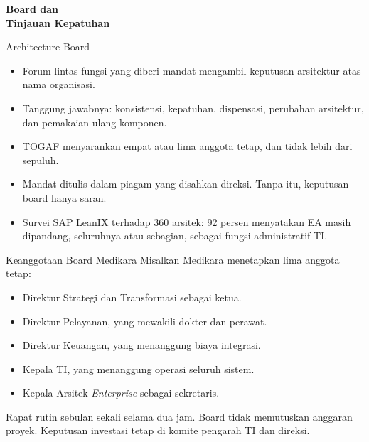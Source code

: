 \documentclass[aspectratio=169, table, 12pt]{beamer}
\begin{document}
\begin{frame}{\hfill}
  \centering
  \Huge{\textbf{Board dan\\Tinjauan Kepatuhan}}
\end{frame}

\begin{frame}{{\Large Architecture Board}}
  \small
  \vspace{4pt}
  \begin{itemize}
    \item Forum lintas fungsi yang diberi mandat mengambil keputusan arsitektur atas nama organisasi.
    \item Tanggung jawabnya: konsistensi, kepatuhan, dispensasi, perubahan arsitektur, dan pemakaian
          ulang komponen.
    \item TOGAF menyarankan empat atau lima anggota tetap, dan tidak lebih dari sepuluh.
    \item Mandat ditulis dalam piagam yang disahkan direksi. Tanpa itu, keputusan board hanya saran.
    \item Survei SAP LeanIX terhadap 360 arsitek: 92 persen menyatakan EA masih dipandang, seluruhnya
          atau sebagian, sebagai fungsi administratif TI.
  \end{itemize}
\end{frame}

\begin{frame}{{\Large Keanggotaan Board Medikara}}
  \small Misalkan Medikara menetapkan lima anggota tetap:
  \begin{itemize}
    \item Direktur Strategi dan Transformasi sebagai ketua.
    \item Direktur Pelayanan, yang mewakili dokter dan perawat.
    \item Direktur Keuangan, yang menanggung biaya integrasi.
    \item Kepala TI, yang menanggung operasi seluruh sistem.
    \item Kepala Arsitek \textit{Enterprise} sebagai sekretaris.
  \end{itemize}
  \vspace{4pt}
  Rapat rutin sebulan sekali selama dua jam. Board tidak memutuskan anggaran proyek. Keputusan investasi
  tetap di komite pengarah TI dan direksi.
\end{frame}
\end{document}
